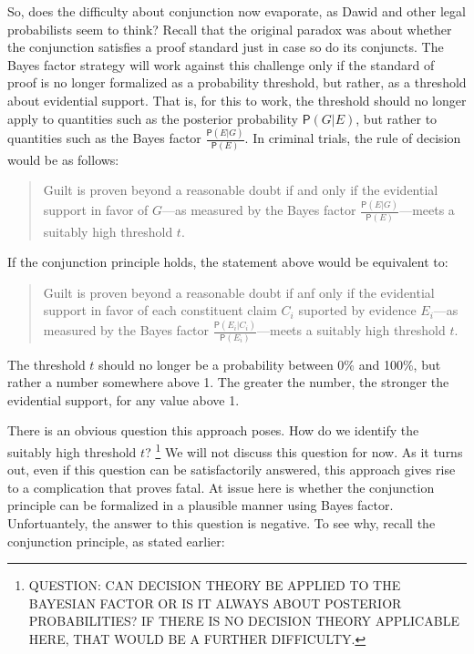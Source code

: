\documentclass[10pt,dvipsnames,enabledeprecatedfontcommands]{scrartcl}
\newcommand{\pr}[1]{\mathsf{P}(#1)}
\begin{document}
So, does the difficulty about conjunction now evaporate, as Dawid and
other legal probabilists  seem to
think? Recall that the original paradox was about whether the
conjunction satisfies a proof standard just in case so do its conjuncts.
The Bayes factor strategy will work against this challenge only if the
standard of proof is no longer formalized as a probability threshold,
but rather, as a threshold about evidential support. That is, for this
to work, the threshold should no longer apply to quantities such as the
posterior probability \(\pr{G | E}\), but rather to quantities such as
the Bayes factor \(\frac{\pr{E | G}}{\pr{E}}\). In criminal trials, the
rule of decision would be as follows:

\begin{quote}
 Guilt is proven beyond a reasonable doubt if and only if the evidential support in favor of  
 $G$---as measured by the Bayes factor $\frac{\pr{E | G}}{\pr{E}}$---meets a suitably high threshold $t$.  
\end{quote}

\noindent
If the conjunction principle
holds,
the statement above would be equivalent
to:

\begin{quote}
Guilt is proven beyond a reasonable doubt if anf only if the evidential support in favor of each constituent claim 
 $C_i$ suported by evidence $E_i$---as measured by the Bayes factor $\frac{\pr{E_i | C_i}}{\pr{E_i}}$---meets a suitably high threshold $t$.
 \end{quote}

\noindent
The threshold \(t\) should no longer be a probability between 0\% and
100\%, but rather a number somewhere above 1. The greater the number,
the stronger the evidential support, for any value above 1.

There is an obvious question this approach poses. How do we identify the
suitably high threshold
\(t\)?
\footnote{QUESTION: CAN DECISION THEORY BE APPLIED TO THE BAYESIAN FACTOR OR IS IT ALWAYS ABOUT POSTERIOR PROBABILITIES? IF THERE IS NO DECISION THEORY APPLICABLE HERE, THAT WOULD BE A FURTHER DIFFICULTY.}
We will not discuss this question for now. As it turns out, even if this
question can be satisfactorily answered, this approach gives rise to a
complication that proves fatal. At issue here is whether the conjunction
principle can be formalized in a plausible manner using Bayes factor.
Unfortuantely, the answer to this question is negative. To see why,
recall the conjunction principle, as stated earlier:
\end{document}
